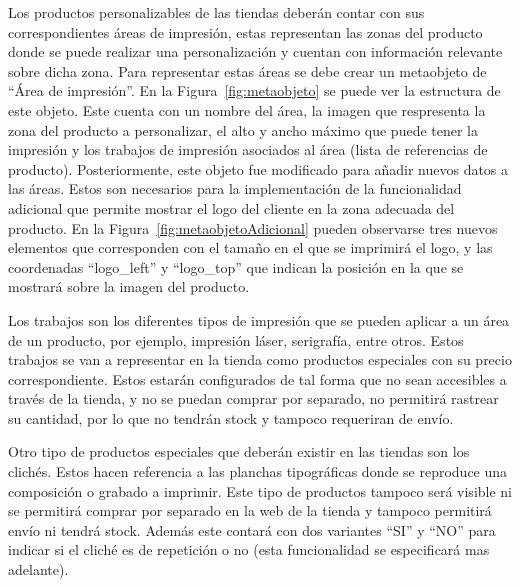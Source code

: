 \documentclass[12pt]{article}
\begin{document}
Los productos personalizables de las tiendas deberán contar con sus correspondientes áreas de impresión, estas representan
las zonas del producto donde se puede realizar una personalización y cuentan con información relevante sobre dicha zona.
Para representar estas áreas se debe crear un metaobjeto de ``Área de impresión''. En la Figura~\ref{fig:metaobjeto} se puede ver la estructura de este 
objeto. Este cuenta con un nombre del área, la imagen que respresenta la zona del producto a personalizar, el alto y ancho máximo que puede tener la impresión y 
los trabajos de impresión asociados al área (lista de referencias de producto). Posteriormente, este objeto fue modificado para añadir nuevos datos a las áreas. Estos son necesarios
para la implementación de la funcionalidad adicional que permite mostrar el logo del cliente en la zona adecuada del producto. 
En la Figura~\ref{fig:metaobjetoAdicional} pueden observarse tres nuevos elementos que corresponden con el tamaño en el que se imprimirá el logo, y las coordenadas ``logo\_left'' 
y ``logo\_top'' que indican la posición en la que se mostrará sobre la imagen del producto.

Los trabajos son los diferentes tipos de impresión que se pueden aplicar a un área de un producto, por ejemplo, impresión láser, serigrafía, entre otros.
Estos trabajos se van a representar en la tienda como productos especiales con su precio correspondiente. Estos estarán configurados de tal forma que no sean accesibles a través de la tienda, y
no se puedan comprar por separado, no permitirá rastrear su cantidad, por lo que no tendrán stock y tampoco requeriran de envío.

Otro tipo de productos especiales que deberán existir en las tiendas son los clichés. Estos hacen referencia a las planchas tipográficas donde se reproduce una composición o grabado
a imprimir. Este tipo de productos tampoco será visible ni se permitirá comprar por separado en la web de la tienda y tampoco permitirá envío  ni tendrá stock.
Además este contará con dos variantes ``SI'' y ``NO'' para indicar si el cliché es de repetición o no (esta funcionalidad se especificará mas adelante).
\end{document}
